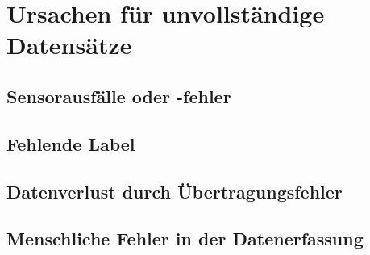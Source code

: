 \section{Ursachen für unvollständige Datensätze}\label{sec:incomplete-data-reason}

\subsection{Sensorausfälle oder -fehler}\label{sec:incomplete-data-sensor-errors}

\subsection{Fehlende Label}\label{sec:incomplete-data-missing-data}

\subsection{Datenverlust durch Übertragungsfehler}\label{sec:incomplete-data-data-loss}

\subsection{Menschliche Fehler in der Datenerfassung}\label{sec:incomplete-data-human-error}